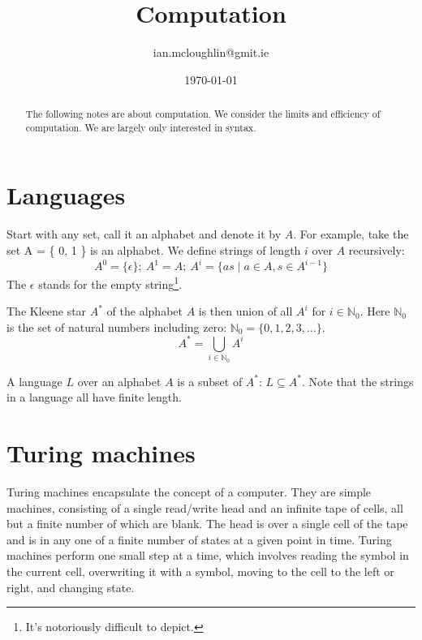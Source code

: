 

\title{Computation}
\author{ian.mcloughlin@gmit.ie}
\date{\today}

\newcommand{\CC}[1]{\textbf{#1}}



\maketitle

\begin{abstract}
  The following notes are about computation.
  We consider the limits and efficiency of computation.
  We are largely only interested in syntax.
\end{abstract}

\section{Languages}
Start with any set, call it an alphabet and denote it by \( A \).
  For example, take the set A = \{ 0, 1 \} is an alphabet.
  We define strings of length \( i \) over \( A \) recursively:
  \[
    A^0 = \{ \epsilon \}; \ 
    A^1 = A; \ 
    A^{i} = \{ as \mid a \in A, s \in A^{i-1} \}
  \]
  The \( \epsilon \) stands for the empty string\footnote{It's notoriously difficult to depict.}.

  The Kleene star \( A^* \) of the alphabet \( A \) is then union of all \( A^i \) for \( i \in \mathbb{N}_0 \).
  Here \( \mathbb{N}_0 \) is the set of natural numbers including zero: \( \mathbb{N}_0 = \{ 0, 1, 2, 3, \ldots \} \).
  \[ A^* = \bigcup_{i \in \mathbb{N}_0} A^i\]

  A language \( L \) over an alphabet \( A \) is a subset of \( A^* \): \( L \subseteq A^* \).
  Note that the strings in a language all have finite length.

\section{Turing machines}
  Turing machines encapsulate the concept of a computer.
  They are simple machines, consisting of a single read/write head and an infinite tape of cells, all but a finite number of which are blank.  
  The head is over a single cell of the tape and is in any one of a finite number of states at a given point in time.
  Turing machines perform one small step at a time, which involves reading the symbol in the current cell, overwriting it with a symbol, moving to the cell to the left or right, and changing state.

